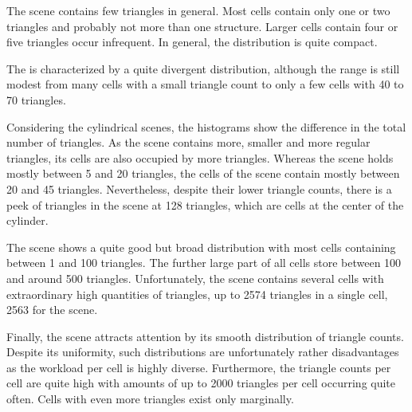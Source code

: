 The \cubes scene contains few triangles in general.
Most cells contain only one or two triangles and probably not more than one structure.
Larger cells contain four or five triangles occur infrequent.
In general, the distribution is quite compact.

The \cylinderhead is characterized by a quite divergent distribution, although the range is still modest from many cells with a small triangle count to only a few cells with 40 to 70 triangles.

Considering the cylindrical scenes, the histograms show the difference in the total number of triangles.
As the \cylindersd scene contains more, smaller and more regular triangles, its cells are also occupied by more triangles.
Whereas the \cylinders scene holds mostly between 5 and 20 triangles, the cells of the \cylindersd scene contain mostly between 20 and 45 triangles.
Nevertheless, despite their lower triangle counts, there is a peek of triangles in the \cylinders scene at 128 triangles, which are cells at the center of the cylinder.

The \impeller scene shows a quite good but broad distribution with most cells containing between 1 and 100 triangles.
The further large part of all cells store between 100 and around 500 triangles.
Unfortunately, the \impeller scene contains several cells with extraordinary high quantities of triangles, up to 2574 triangles in a single cell, 2563 for the \impellerhalf scene.

Finally, the \turbine scene attracts attention by its smooth distribution of triangle counts.
Despite its uniformity, such distributions are unfortunately rather disadvantages as the workload per cell is highly diverse.
Furthermore, the triangle counts per cell are quite high with amounts of up to 2000 triangles per cell occurring quite often.
Cells with even more triangles exist only marginally.

